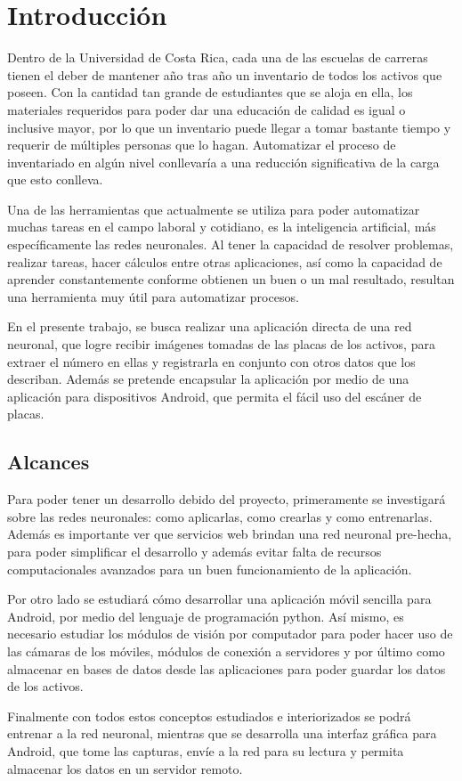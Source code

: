   \chapter{Introducción}
\label{C:introduccion}
Dentro de la Universidad de Costa Rica, cada una de las escuelas de carreras tienen el deber de mantener año tras año un inventario de todos los activos que poseen. Con la cantidad tan grande de estudiantes que se aloja en ella, los materiales requeridos para poder dar una educación de calidad es igual o inclusive mayor, por lo que un inventario puede llegar a tomar bastante tiempo y requerir de múltiples personas que lo hagan. Automatizar el proceso de inventariado en algún nivel conllevaría a una reducción significativa de la carga que esto conlleva.
\par
Una de las herramientas que actualmente se utiliza para poder automatizar muchas tareas en el campo laboral y cotidiano, es la inteligencia artificial, más específicamente las redes neuronales. Al tener la capacidad de resolver problemas, realizar tareas, hacer cálculos entre otras aplicaciones, así como la capacidad de aprender constantemente conforme obtienen un buen o un mal resultado, resultan una herramienta muy útil para automatizar procesos.
\par
En el presente trabajo, se busca realizar una aplicación directa de una red neuronal, que logre recibir imágenes tomadas de las placas de los activos, para extraer el número en ellas y registrarla en conjunto con otros datos que los describan. Además se pretende encapsular la aplicación por medio de una aplicación para dispositivos Android, que permita el fácil uso del escáner de placas.

\section{Alcances}
Para poder tener un desarrollo debido del proyecto, primeramente se investigará sobre las redes neuronales: como aplicarlas, como crearlas y como entrenarlas. Además es importante ver que servicios web brindan una red neuronal pre-hecha, para poder simplificar el desarrollo y además evitar falta de recursos computacionales avanzados para un buen funcionamiento de la aplicación. 
\par
Por otro lado se estudiará cómo desarrollar una aplicación móvil sencilla para Android, por medio del lenguaje de programación python. Así mismo, es necesario estudiar los módulos de visión por computador para poder hacer uso de las cámaras de los móviles, módulos de conexión a servidores y por último como almacenar en bases de datos desde las aplicaciones para poder guardar los datos de los activos.
\par
Finalmente con todos estos conceptos estudiados e interiorizados se podrá entrenar a la red neuronal, mientras que se desarrolla una interfaz gráfica para Android, que tome las capturas, envíe a la red para su lectura y permita almacenar los datos en un servidor remoto.

